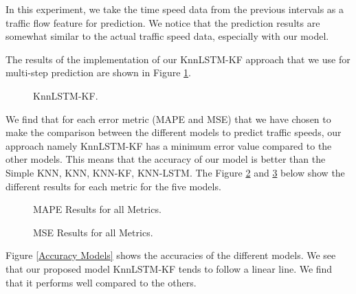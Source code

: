In this experiment, we take the time speed data from the previous intervals as a traffic flow feature for prediction. We notice that the prediction results are somewhat similar to the actual traffic speed data, especially with our model.

The results of the implementation of our KnnLSTM-KF approach that we use for multi-step prediction are shown in Figure \ref{KnnLSTM-KF}.


\begin{figure}[!h]
	\begin{center}
	\end{center}
	\caption{KnnLSTM-KF.}
	\label{KnnLSTM-KF}
\end{figure}

We find that for each error metric (MAPE and MSE) that we have chosen to make the comparison between the different models to predict traffic speeds, our approach namely KnnLSTM-KF has a minimum error value compared to the other models. This means that the accuracy of our model is better than the Simple KNN, KNN, KNN-KF, KNN-LSTM. The Figure \ref{MAPE Results for all Metrics} and \ref{MSE Results for all Metrics} below show the different results for each metric for the five models. 


\begin{figure}[!h]
	\begin{center}
	\end{center}
	\caption{MAPE Results for all Metrics.}
	\label{MAPE Results for all Metrics}
\end{figure}

\begin{figure}[!h]
	\begin{center}
	\end{center}
	\caption{MSE Results for all Metrics.}
	\label{MSE Results for all Metrics}
\end{figure}


\pagebreak

Figure \ref{Accuracy Models} shows the accuracies of the different models. We see that our proposed model KnnLSTM-KF tends to follow a linear line. We find that it performs well compared to the others.

